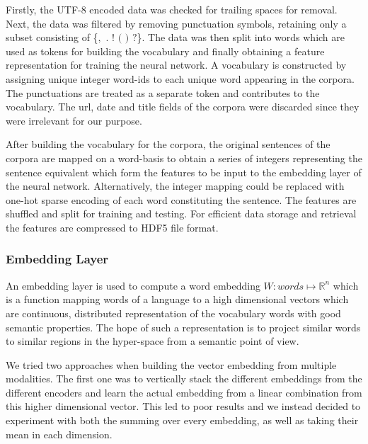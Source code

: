 \documentclass[12pt]{article}
\begin{document}
Firstly, the UTF-8 encoded data was checked for trailing spaces for removal. Next, the data was filtered by removing punctuation symbols, retaining only a subset consisting of \{$,$ $.$ $!$ $($ $)$ $?$\}. The data was then split into words which are used as tokens for building the vocabulary and finally obtaining a feature representation for training the neural network. A vocabulary is constructed by assigning unique integer word-ids to each unique word appearing in the corpora. The punctuations are treated as a separate token and contributes to the vocabulary. The url, date and title fields of the corpora were discarded since they were irrelevant for our purpose.  

After building the vocabulary for the corpora, the original sentences of the corpora are mapped on a word-basis to obtain a series of integers representing the sentence equivalent which form the features to be input to the embedding layer of the neural network. Alternatively, the integer mapping could be replaced with one-hot sparse encoding of each word constituting the sentence. The features are shuffled and split for training and testing. For efficient data storage and retrieval the features are compressed to HDF5 file format.

\subsubsection{Embedding Layer}
An embedding layer is used to compute a word embedding $W: words \mapsto \mathbb{R}^{n}$ which is a function mapping words of a language to a high dimensional vectors which are continuous, distributed representation of the vocabulary words with good semantic properties. The hope of such a representation is to project similar words to similar regions in the hyper-space from a semantic point of view. 

We tried two approaches when building the vector embedding from multiple modalities. The first one was to vertically stack the different embeddings from the different encoders and learn the actual embedding from a linear combination from this higher dimensional vector. This led to poor results and we instead decided to experiment with both the summing over every embedding, as well as taking their mean in each dimension.

\end{document}
